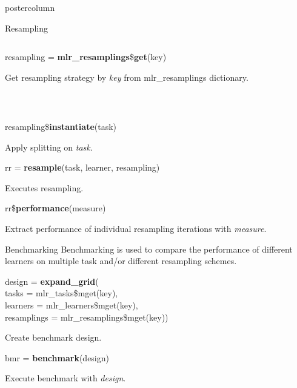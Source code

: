 \documentclass{beamer}
\begin{document}
\begin{frame}[fragile]{}
\begin{columns}
\begin{column}{.245\textwidth}
\begin{beamercolorbox}[center]{postercolumn}
\begin{minipage}{.98\textwidth}
{\begin{myblock}{Resampling}
\begin{minipage}{\textwidth}
\begin{columns}[T]
\begin{column}{0.8\textwidth}
										  \begin{codebox}
										    resampling = \textbf{mlr\_resamplings}\$\textbf{get}(key)
										  \end{codebox}
										  Get resampling strategy by \textit{key} from mlr\_resamplings dictionary.
								    \end{column}
							     \end{columns}
					      	\end{minipage}
						      \\[\baselineskip]
						      \begin{codebox}
							      resampling\$\textbf{instantiate}(task)
						      \end{codebox}
						      Apply splitting on \textit{task}.
						      \\
					      	\begin{codebox}
							      rr = \textbf{resample}(task, learner, resampling)
						      \end{codebox}
						      Executes resampling.
						      \\
						      \begin{codebox}
							      rr\$\textbf{performance}(measure)
						      \end{codebox}
						      Extract performance of individual resampling iterations with \textit{measure}.
					      \end{myblock}
				        \begin{myblock}{Benchmarking}
						      Benchmarking is used to compare the performance of different learners on multiple task and/or different resampling schemes.
						    \\
						      \begin{codeboxmultiline}[width=21.95cm]
							      design = \textbf{expand\_grid}(\\
							      tasks = mlr\_tasks\$mget(key),\\
							      learners = mlr\_learners\$mget(key),\\
							      resamplings = mlr\_resamplings\$mget(key))
						      \end{codeboxmultiline}
						      Create benchmark design.
						      \\
						      \begin{codebox}
							      bmr = \textbf{benchmark}(design)
						      \end{codebox}
						      Execute benchmark with \textit{design}.
					      	\\

\end{myblock}}
\end{minipage}
\end{beamercolorbox}
\end{column}
\end{columns}
\end{frame}
\end{document}
